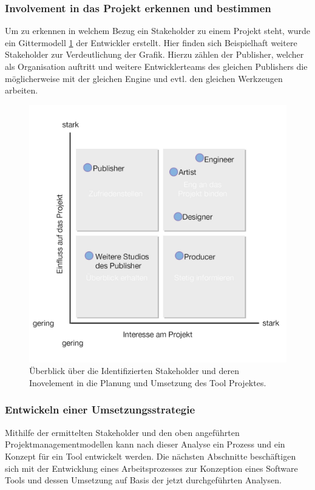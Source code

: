 \documentclass[pagesize, paper=a4, fontsize=12pt, titlepage=true, headings=small, headnosepline, abstractoff, liststotoc, nochapterprefix, plainheadsepline, twoside]{scrreprt}
\begin{document}
\subsubsection{Involvement in das Projekt erkennen und bestimmen}
Um zu erkennen in welchem Bezug ein Stakeholder zu einem Projekt steht, wurde ein Gittermodell \ref{StakeholderGrafik} der Entwickler erstellt. Hier finden sich Beispielhaft weitere Stakeholder zur Verdeutlichung der Grafik. Hierzu zählen der Publisher, welcher als Organisation auftritt und weitere Entwicklerteams des gleichen Publishers die möglicherweise mit der gleichen Engine und evtl. den gleichen Werkzeugen arbeiten.

\begin{figure}[ht]
	\centering
	\includegraphics[width=\linewidth]{Bilder/Stakeholder_Diagramm.jpg}
	\caption{Überblick über die Identifizierten Stakeholder und deren Inovelement in die Planung und Umsetzung des Tool Projektes.}
	\label{StakeholderGrafik}
\end{figure}

\subsubsection{Entwickeln einer Umsetzungsstrategie}
Mithilfe der ermittelten Stakeholder und den oben angeführten Projektmanagementmodellen kann nach dieser Analyse ein Prozess und ein Konzept für ein Tool entwickelt werden. Die nächsten Abschnitte beschäftigen sich mit der Entwicklung eines Arbeitsprozesses zur Konzeption eines Software Tools und dessen Umsetzung auf Basis der jetzt durchgeführten Analysen.
\end{document}
